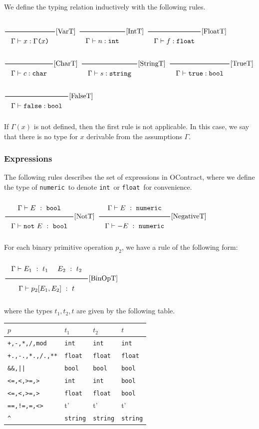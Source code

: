 \documentclass[a4paper]{article}
\newcommand{\RuleWithName}[3]{\genfrac{}{}{0.7pt}{}{{\setlength{\fboxrule}{0pt}\setlength{\fboxsep}{3mm}\fbox{$#1$}}}{{\setlength{\fboxrule}{0pt}\setlength{\fboxsep}{3mm}\fbox{$#2$}}}[\text{#3}]}
\newcommand{\TruE}{\texttt{true}}
\newcommand{\FalsE}{\texttt{false}}
\newcommand{\Int}{\texttt{int}}
\newcommand{\Float}{\texttt{float}}
\newcommand{\String}{\texttt{string}}
\newcommand{\Char}{\texttt{char}}
\newcommand{\Num}{\texttt{numeric}}
\newcommand{\Bool}{\texttt{bool}}
\newcommand{\Rp}{\texttt{)}}
\newcommand{\Lp}{\texttt{(}}
\begin{document}
We define the typing relation inductively with the following rules.

$\RuleWithName{}{\Gamma \vdash x : \Gamma \Lp x \Rp}{VarT}$
\hfill
$\RuleWithName{}{\Gamma \vdash n : \Int}{IntT}$
\hfill
$\RuleWithName{}{\Gamma \vdash f : \Float}{FloatT}$
\hfill
$\RuleWithName{}{\Gamma \vdash c : \Char}{CharT}$
\hfill
$\RuleWithName{}{\Gamma \vdash s : \String}{StringT}$
\hfill
$\RuleWithName{}{\Gamma \vdash \TruE : \Bool}{TrueT}$
\hfill
$\RuleWithName{}{\Gamma \vdash \FalsE : \Bool}{FalseT}$

If $\Gamma(x)$ is not defined, then the first rule is not applicable.
In this case, we say that there is no type for $x$ derivable from the assumptions $\Gamma$.

\subsubsection{Expressions}

The following rules describes the set of expressions in OContract,
where we define the type of \Num\ to denote \Int\ or \Float\ for convenience.

$\RuleWithName{\Gamma \vdash E\ :\ \Bool}{\Gamma \vdash \texttt{not}\ E\ :\ \Bool}{NotT}$
\hfill
$\RuleWithName{\Gamma \vdash E\ :\ \Num}{\Gamma \vdash - E\ :\ \Num}{NegativeT}$

For each binary primitive operation $p_2$, we have a rule of the following form:

\begin{center}
    $\RuleWithName{\Gamma \vdash E_1\ :\ t_1\ \quad E_2\ :\ t_2}{\Gamma \vdash p_2[E_1, E_2]\ :\ t}{BinOpT}$
\end{center}

where the types $t_1, t_2, t$ are given by the following table.

\begin{tabular}{|l||l|l|l|} \hline
    $p$ & $t_1$ & $t_2$ & $t$ \\ \hline \hline
    \verb#+,-,*,/,mod# & \Int & \Int & \Int \\ \hline
    \verb#+.,-.,*.,/.,**# & \Float & \Float & \Float \\ \hline
    \verb#&&,||#  & \Bool & \Bool & \Bool \\ \hline
    \verb#<=,<,>=,># & \Int & \Int & \Bool \\ \hline
    \verb#<=,<,>=,># & \Float & \Float & \Bool \\ \hline
    \verb#==,!=,=,<># & t' & t' & t' \\ \hline
    \verb#^# & \String & \String & \String \\ \hline
\end{tabular}
\vspace{3mm}
\end{document}
